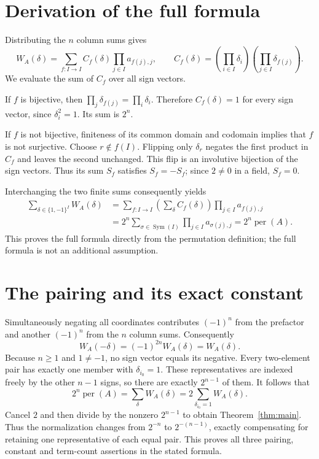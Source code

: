 \documentclass[11pt]{article}
\newcommand{\per}{\operatorname{per}}
\begin{document}
\section*{Derivation of the full formula}
Distributing the $n$ column sums gives
\[
 W_A(\delta)=\sum_{f:I\to I}C_f(\delta)
                     \prod_{j\in I}a_{f(j),j},\qquad
 C_f(\delta)=\left(\prod_{i\in I}\delta_i\right)
                    \left(\prod_{j\in I}\delta_{f(j)}\right).
\]
We evaluate the sum of $C_f$ over all sign vectors.

If $f$ is bijective, then $\prod_j\delta_{f(j)}=\prod_i\delta_i$.
Therefore $C_f(\delta)=1$ for every sign vector, since
$\delta_i^2=1$. Its sum is $2^n$.

If $f$ is not bijective, finiteness of its common domain and codomain
implies that $f$ is not surjective. Choose $r\notin f(I)$.
Flipping only $\delta_r$ negates the first product in $C_f$ and
leaves the second unchanged. This flip is an involutive bijection
of the sign vectors. Thus its sum $S_f$ satisfies $S_f=-S_f$;
since $2\ne0$ in a field, $S_f=0$.

Interchanging the two finite sums consequently yields
\begin{align*}
 \sum_{\delta\in\{1,-1\}^I}W_A(\delta)
 &=\sum_{f:I\to I}\left(\sum_\delta C_f(\delta)\right)
                           \prod_{j\in I}a_{f(j),j}\\
 &=2^n\sum_{\sigma\in\operatorname{Sym}(I)}
                           \prod_{j\in I}a_{\sigma(j),j}
 =2^n\per(A).
\end{align*}
This proves the full formula directly from the permutation
definition; the full formula is not an additional assumption.

\section*{The pairing and its exact constant}
Simultaneously negating all coordinates contributes $(-1)^n$
from the prefactor and another $(-1)^n$ from the $n$ column sums.
Consequently
\[
 W_A(-\delta)=(-1)^{2n}W_A(\delta)=W_A(\delta).
\]
Because $n\ge1$ and $1\ne-1$, no sign vector equals its negative.
Every two-element pair has exactly one member with
$\delta_{i_0}=1$. These representatives are indexed freely by
the other $n-1$ signs, so there are exactly $2^{n-1}$ of them.
It follows that
\[
 2^n\per(A)=\sum_\delta W_A(\delta)
       =2\sum_{\delta_{i_0}=1}W_A(\delta).
\]
Cancel $2$ and then divide by the nonzero $2^{n-1}$ to obtain
Theorem~\ref{thm:main}. Thus the normalization changes from
$2^{-n}$ to $2^{-(n-1)}$, exactly compensating for retaining one
representative of each equal pair. This proves all three pairing,
constant and term-count assertions in the stated formula.
\end{document}
